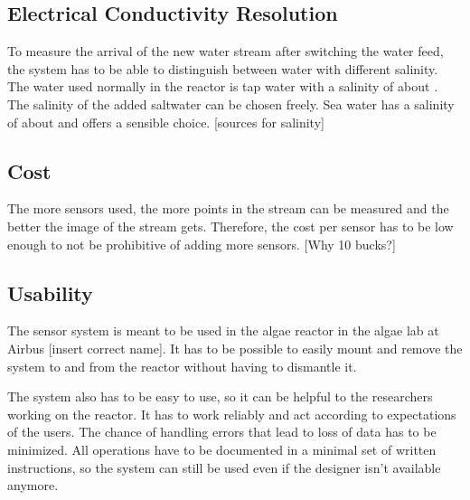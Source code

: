 \subsection{Electrical Conductivity Resolution}

To measure the arrival of the new water stream after switching the water feed, the system has to be able to distinguish between water with different salinity. The water used normally in the reactor is tap water with a salinity of about . The salinity of the added saltwater can be chosen freely. Sea water has a salinity of about  and offers a sensible choice. [sources for salinity]

\subsection{Cost}

The more sensors used, the more points in the stream can be measured and the better the image of the stream gets. Therefore, the cost per sensor has to be low enough to not be prohibitive of adding more sensors. [Why 10 bucks?]

\subsection{Usability}

The sensor system is meant to be used in the algae reactor in the algae lab at Airbus [insert correct name]. It has to be possible to easily mount and remove the system to and from the reactor without having to dismantle it.

The system also has to be easy to use, so it can be helpful to the researchers working on the reactor. It has to work reliably and act according to expectations of the users. The chance of handling errors that lead to loss of data has to be minimized. All operations have to be documented in a minimal set of written instructions, so the system can still be used even if the designer isn't available anymore.

